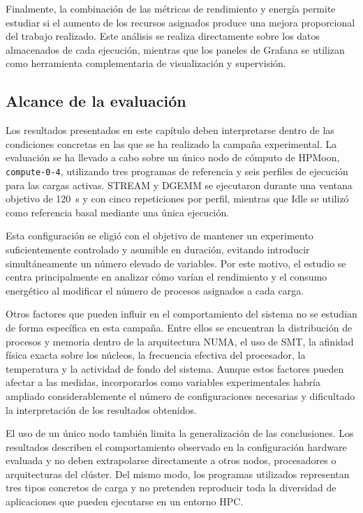 Finalmente, la combinación de las métricas de rendimiento y energía permite estudiar si el aumento de los recursos asignados produce una mejora proporcional del trabajo realizado. Este análisis se realiza directamente sobre los datos almacenados de cada ejecución, mientras que los paneles de Grafana se utilizan como herramienta complementaria de visualización y supervisión.

\subsection{Alcance de la evaluación}
\label{sec:alcance-cap6}

Los resultados presentados en este capítulo deben interpretarse dentro de las condiciones concretas en las que se ha realizado la campaña experimental. La evaluación se ha llevado a cabo sobre un único nodo de cómputo de HPMoon, \texttt{compute-0-4}, utilizando tres programas de referencia y seis perfiles de ejecución para las cargas activas. STREAM y DGEMM se ejecutaron durante una ventana objetivo de 120~s y con cinco repeticiones por perfil, mientras que Idle se utilizó como referencia basal mediante una única ejecución.

Esta configuración se eligió con el objetivo de mantener un experimento suficientemente controlado y asumible en duración, evitando introducir simultáneamente un número elevado de variables. Por este motivo, el estudio se centra principalmente en analizar cómo varían el rendimiento y el consumo energético al modificar el número de procesos asignados a cada carga.

Otros factores que pueden influir en el comportamiento del sistema no se estudian de forma específica en esta campaña. Entre ellos se encuentran la distribución de procesos y memoria dentro de la arquitectura NUMA, el uso de SMT, la afinidad física exacta sobre los núcleos, la frecuencia efectiva del procesador, la temperatura y la actividad de fondo del sistema. Aunque estos factores pueden afectar a las medidas, incorporarlos como variables experimentales habría ampliado considerablemente el número de configuraciones necesarias y dificultado la interpretación de los resultados obtenidos.

El uso de un único nodo también limita la generalización de las conclusiones. Los resultados describen el comportamiento observado en la configuración hardware evaluada y no deben extrapolarse directamente a otros nodos, procesadores o arquitecturas del clúster. Del mismo modo, los programas utilizados representan tres tipos concretos de carga y no pretenden reproducir toda la diversidad de aplicaciones que pueden ejecutarse en un entorno HPC.

